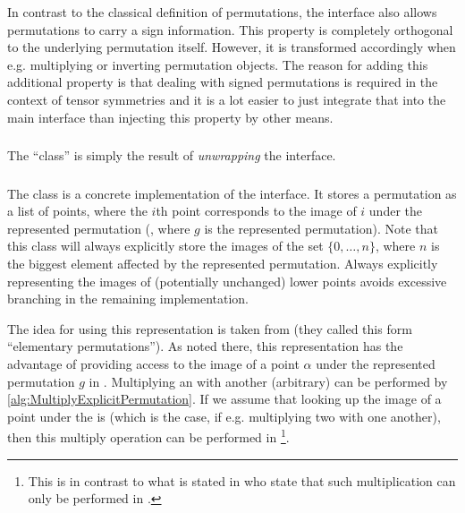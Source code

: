 \documentclass[parskip=half]{scrartcl}
\begin{document}
	In contrast to the classical definition of permutations, the  interface also allows permutations to carry a sign
	information. This property is completely orthogonal to the underlying permutation itself. However, it is transformed accordingly when e.g.
	multiplying or inverting permutation objects. The reason for adding this additional property is that dealing with signed permutations is required
	in the context of tensor symmetries and it is a lot easier to just integrate that into the main interface than injecting this property by other
	means.


	\subsubsection{\texorpdfstring{}{Permutation}}

	The  \enquote{class} is simply the result of \emph{unwrapping} the  interface.


	\subsubsection{\texorpdfstring{}{ExplicitPermutation}}

	The  class is a concrete implementation of the  interface. It stores a permutation as a list
	of points, where the $i$th point corresponds to the image of $i$ under the represented permutation (, where
	$g$ is the represented permutation). Note that this class will always explicitly store the images of the set $\{ 0, \ldots, n \}$, where $n$
	is the biggest element affected by the represented permutation. Always explicitly representing the images of (potentially unchanged) lower points
	avoids excessive branching in the remaining implementation.

	The idea for using this representation is taken from \textcite{Rehn2010} (they called this form \enquote{elementary permutations}). As noted
	there, this representation has the advantage of providing access to the image of a point $\alpha$ under the represented permutation $g$ in
	. Multiplying an  with another (arbitrary)  can be performed by
	\cref{alg:MultiplyExplicitPermutation}. If we assume that looking up the image of a point under the  is  (which
	is the case, if e.g. multiplying two  with one another), then this multiply operation can be performed in
	\footnote{This is in contrast to what is stated in \textcite{Rehn2010} who state that such multiplication can only be performed in
	.}.
\end{document}
